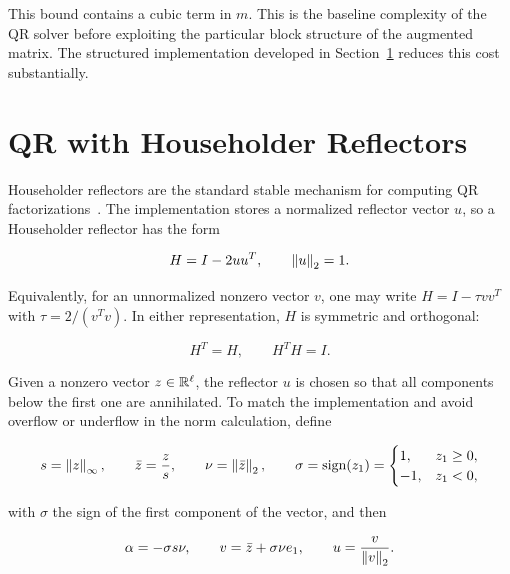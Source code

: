 \noindent This bound contains a cubic term in $m$.
This is the baseline complexity of the QR solver before exploiting the particular block structure of the augmented matrix. The structured implementation developed in Section~\ref{sec:householder_qr} reduces this cost substantially.


\section{QR with Householder Reflectors}
\label{sec:householder_qr}

\noindent Householder reflectors are the standard stable mechanism for computing QR factorizations~\cite{trefethen1997,golub2013}. The implementation stores a normalized reflector vector $u$, so a Householder reflector has the form

\begin{equation}
\label{eq:householder_def}
    H = I - 2uu^T,
    \qquad
    \left\|u\right\|_2=1.
\end{equation}

\noindent Equivalently, for an unnormalized nonzero vector $v$, one may write
$H=I-\tau vv^T$ with $\tau=2/(v^T v)$. In either representation, $H$ is
symmetric and orthogonal:

\begin{equation}
    H^T = H,
    \qquad
    H^T H = I.
\end{equation}

\noindent Given a nonzero vector $z\in\mathbb{R}^\ell$, the reflector $u$ is chosen so that all components below the first one are annihilated. To match the implementation and
avoid overflow or underflow in the norm calculation, define

\begin{equation}
\label{eq:stable_householder_vector}
    s=\left\|z\right\|_\infty,
    \qquad
    \bar z=\frac{z}{s},
    \qquad
    \nu=\left\|\bar z\right\|_2,
    \qquad
    \sigma=\text{sign}(z_1)=\begin{cases}1,&z_1\geq0,\\-1,&z_1<0,
    \end{cases}
\end{equation}

\noindent with $\sigma$ the sign of the first component of the vector, and then

\begin{equation}
    \alpha=-\sigma s\nu,
    \qquad
    v=\bar z+\sigma\nu e_1,
    \qquad
    u=\frac{v}{\left\|v\right\|_2}.
\end{equation}

